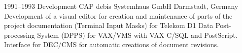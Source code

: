 \cventry
{1991--1993}
{Development}
{}
{CAP debis Systemhaus GmbH}
{Darmstadt, Germany}
{
  Development of a visual editor for creation and maintenance of parts of the project documentation
  (Terminal Input Masks) for Telekom D1 Data Post-processing System (DPPS) for VAX/VMS with
  VAX C/SQL and PostScript. Interface for DEC/CMS for automatic creations of document revisions.
}
